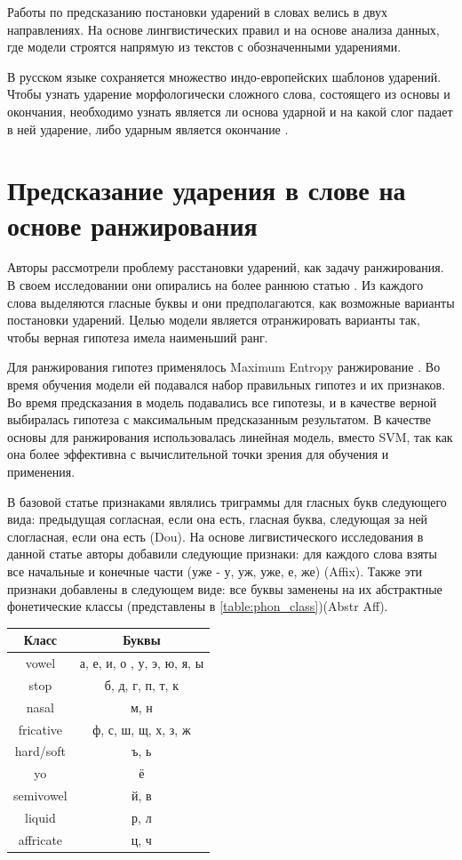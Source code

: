 \documentclass[14pt, a4paper, russian]{report}
\begin{document}
\begin{normalsize}
Работы по предсказанию постановки ударений в словах велись в двух направлениях. На основе лингвистических правил \cite{church, williams} и на основе анализа данных, где модели строятся напрямую из текстов с обозначенными ударениями. 

В русском языке сохраняется множество индо-европейских шаблонов ударений. Чтобы узнать ударение морфологически сложного слова, состоящего из основы и окончания, необходимо узнать является ли основа ударной и на какой слог падает в ней ударение, либо ударным является окончание \cite{halle}.
\section{Предсказание ударения в слове на основе ранжирования}
Авторы \cite{hall} рассмотрели проблему расстановки ударений, как задачу ранжирования. В своем исследовании  они опирались на более раннюю статью \cite{dou}. Из каждого слова выделяются гласные буквы и они предполагаются, как возможные варианты постановки ударений. Целью модели является отранжировать варианты так, чтобы верная гипотеза имела наименьший ранг.

Для ранжирования гипотез применялось Maximum Entropy ранжирование \cite{collins}. Во время обучения модели ей подавался набор правильных гипотез и их признаков. Во время предсказания в модель подавались все гипотезы, и в качестве верной выбиралась гипотеза с максимальным предсказанным результатом. В качестве основы для ранжирования использовалась линейная модель, вместо SVM, так как она более эффективна с вычислительной точки зрения для обучения и применения. 

В базовой статье \cite{dou} признаками являлись триграммы для гласных букв следующего вида: предыдущая согласная, если она есть, гласная буква, следующая за ней слогласная, если она есть (Dou). На основе лигвистического исследования в данной статье авторы добавили следующие признаки: для каждого слова взяты все начальные и конечные части (уже - у, уж, уже, е, же) (Affix). Также эти признаки добавлены в следующем виде: все буквы заменены на их абстрактные фонетические классы (представлены в \cref{table:phon_class})({Abstr Aff}).
\begin{table}[H]
	\begin{small}
		\begin{center}
			\begin{tabular}{|c|c|}
				\hline
				Класс & Буквы \\			
				\hline
				vowel & а, е, и, о , у, э, ю, я, ы \\
				\hline
				stop & б, д, г, п, т, к \\
				\hline
				nasal & м, н \\
				\hline
				fricative & ф, с, ш, щ, х, з, ж \\
\hline
				hard/soft & ъ, ь\\
\hline
				yo & ё \\
\hline
				semivowel & й, в \\
\hline
				liquid & р, л\\
\hline
				affricate & ц, ч \\
\hline
		

\end{tabular}
\end{center}
\end{small}
\end{table}
\end{normalsize}
\end{document}
